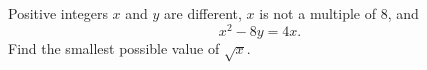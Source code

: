 Positive integers $x$ and $y$ are different, $x$ is not a multiple of $8$, and
\[x^2-8y=4x .\]
Find the smallest possible value of $\sqrt x$.
